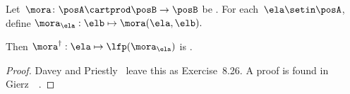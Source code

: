 \begin{lemma}
    \label{lem:dagger}
    Let~$\mora\colon\posA\cartprod\posB\to\posB$ be \scottcontinuous.
    For each~$\ela\setin\posA$, define $\mora_{\ela}:\elb\mapsto \mora(\ela,\elb).
    $

    Then $\mora^{\dagger}:\ela\mapsto\lfp(\mora_{\ela})$ is \scottcontinuous.
\end{lemma}
\begin{proof}
    Davey and Priestly~\cite{davey02} leave this as Exercise~8.26.
    A proof is found in Gierz~\etal~\cite[Exercise II-2.29]{gierz03continuous}.
\end{proof}

